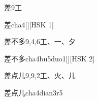 \begin{entry}{差}{9}{⼯}
  \begin{phonetics}{差}{cha4}[][HSK 1]
  \end{phonetics}
\end{entry}

\begin{entry}{差不多}{9,4,6}{⼯、⼀、⼣}
  \begin{phonetics}{差不多}{cha4bu5duo1}[][HSK 2]
  \end{phonetics}
\end{entry}

\begin{entry}{差点儿}{9,9,2}{⼯、⽕、⼉}
  \begin{phonetics}{差点儿}{cha4dian3r5}
  \end{phonetics}
\end{entry}


